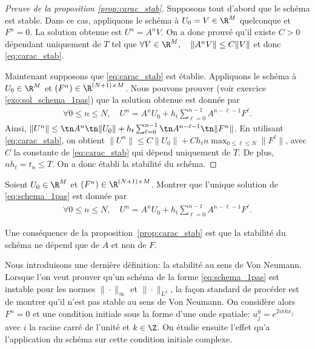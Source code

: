 \documentclass[12pt,a4paper,twoside]{article}
\begin{document}
\begin{proof}[Preuve de la proposition \ref{prop:carac_stab}]
  Supposons tout d'abord que le sch\'ema est stable.
  Dans ce cas, appliquons le sch\'ema \`a $U_0 = V \in \R^{M}$
  quelconque et $F^n = 0$. 
  La solution obtenue est $U^n = A^n V$.
  On a donc prouv\'e qu'il existe $C>0$ d\'ependant uniquement
  de $T$ tel que
  $\forall V \in \R^{M} , \quad \| A^n V \| \leq C \| V \|$
  et donc \eqref{eq:carac_stab}.

  Maintenant supposons que \eqref{eq:carac_stab} est \'etablie.
  Appliquons le sch\'ema \`a $U_0 \in \R^{M}$
  et $(F^n) \in \R^{(N+1) \times M}$.
  Nous pouvons prouver (voir exercice \ref{exo:sol_schema_1pas}) 
  que la solution obtenue est donn\'ee par
  \begin{align*}
    \forall 0 \leq n \leq N , \quad U^n = A^n U_0 + h_t \sum_{\ell = 0}^{n-1} A^{n-\ell-1} F^{\ell} .
  \end{align*}
  Ainsi, $\| U^n \| \leq \tn A^n \tn \| U_0 \| 
  + h_t \sum_{\ell = 0}^{n-1} \tn A^{n-\ell-1} \tn \| F^n \|$.
  En utilisant \eqref{eq:carac_stab}, on obtient
  $\| U^n \| \leq C \| U_0 \| + C h_t n \max_{0\leq \ell \leq N} \| F^{\ell} \|$,
  avec $C$ la constante de \eqref{eq:carac_stab} qui d\'epend
  uniquement de $T$.
  De plus, $n h_t = t_n \leq T$.
  On a donc \'etabli la stabilit\'e du sch\'ema.
\end{proof}


\begin{exercise}
  \label{exo:sol_schema_1pas}
  Soient $U_0 \in \R^{M}$ et $(F^n) \in \R^{(N+1) \times M}$.
  Montrer que l'unique solution de \eqref{eq:schema_1pas}
  est donn\'ee par
  \begin{align}
    \label{eq:sol_Un}
    \forall 0 \leq n \leq N , \quad  U^n = A^n U_0 + h_t \sum_{\ell = 0}^{n-1} A^{n-\ell-1} F^{\ell} .
  \end{align}
\end{exercise}


\begin{remark}
  Une cons\'equence de la proposition~\ref{prop:carac_stab} est que
  la stabilit\'e du sch\'ema ne d\'epend que de $A$ et non de $F$.
\end{remark}


Nous introduisons une derni\`ere d\'efinition: la stabilit\'e
au sens de Von Neumann.
Lorsque l'on veut prouver qu'un sch\'ema de la forme \eqref{eq:schema_1pas}
est instable pour les normes $\| \cdot \|_{\infty}$ et $\| \cdot \|_{L^2}$, la fa\c{c}on standard
de proc\'eder est de montrer qu'il n'est pas stable au sens de Von Neumann.
On consid\`ere alors $F^n = 0$ et une condition initiale sous la forme
d'une onde spatiale: $u_j^0 = e^{2 i \pi k x_j}$ avec $i$ la racine carr\'e de l'unit\'e
et $k \in \Z$.
On \'etudie ensuite l'effet qu'a l'application du sch\'ema sur cette condition initiale complexe.
\end{document}
